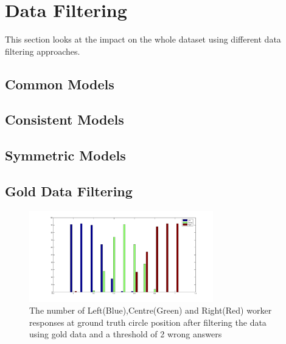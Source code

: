 \section{Data Filtering}

This section looks at the impact on the whole dataset using different data filtering approaches. 

\subsection{Common Models}




\subsection{Consistent Models}

\subsection{Symmetric Models}


\subsubsection{}

\subsection{Gold Data Filtering}

\begin{figure}[!htb]
  \centering
  \includegraphics[width=8cm]{bar_responses_2_gold.png}
  \caption{The number of Left(Blue),Centre(Green) and Right(Red) worker responses at ground truth circle position after filtering the data using gold data and a threshold of 2 wrong answers}
  \label{Figure:bar responses 2 gold}
\end{figure}



